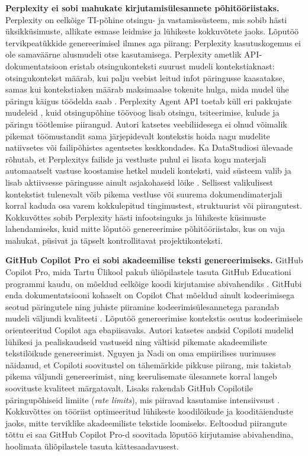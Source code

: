 \textbf{Perplexity ei sobi mahukate kirjutamisülesannete põhitööriistaks.} Perplexity on eelkõige TI-põhine otsingu- ja vastamissüsteem, mis sobib hästi üksikküsimuste, allikate esmase leidmise ja lühikeste kokkuvõtete jaoks. Lõputöö tervikpeatükkide genereerimisel ilmnes aga piirang: Perplexity kasutuskogemus ei ole samaväärne alusmudeli otse kasutamisega. Perplexity ametlik API-dokumentatsioon eristab otsingukonteksti suurust mudeli kontekstiaknast: otsingukontekst määrab, kui palju veebist leitud infot päringusse kaasatakse, samas kui kontekstiaken määrab maksimaalse tokenite hulga, mida mudel ühe päringu käigus töödelda saab \cite{perplexity2026pricing}. Perplexity Agent API toetab küll eri pakkujate mudeleid \cite{perplexity2026models}, kuid otsingupõhine töövoog lisab otsingu, tsiteerimise, kulude ja päringu töötlemise piirangud. Autori katsetes veebiliidesega ei olnud võimalik pikemat töömustandit sama järjepidevalt kontekstis hoida nagu mudelite natiivsetes või failipõhistes agentsetes keskkondades. Ka DataStudiosi ülevaade rõhutab, et Perplexitys failide ja vestluste puhul ei lisata kogu materjali automaatselt vastuse koostamise hetkel mudeli konteksti, vaid süsteem valib ja lisab aktiivsesse päringusse ainult asjakohaseid lõike \cite{datastudios2025perplexity}. Sellisest valikulisest kontekstist tulenevalt võib pikema vestluse või suurema dokumendimaterjali korral kaduda osa varem kokkulepitud tingimustest, struktuurist või piirangutest. Kokkuvõttes sobib Perplexity hästi infootsinguks ja lühikeste küsimuste lahendamiseks, kuid mitte lõputöö genereerimise põhitööriistaks, kus on vaja mahukat, püsivat ja täpselt kontrollitavat projektikonteksti.

\textbf{GitHub Copilot Pro ei sobi akadeemilise teksti genereerimiseks.} GitHub Copilot Pro, mida Tartu Ülikool pakub üliõpilastele tasuta GitHub Educationi programmi kaudu, on mõeldud eelkõige koodi kirjutamise abivahendiks \cite{github2026copilot}. GitHubi enda dokumentatsiooni kohaselt on Copilot Chat mõeldud ainult kodeerimisega seotud päringutele ning juhiste piiramine kodeerimisülesannetega parandab mudeli väljundi kvaliteeti \cite{github2026copilot_responsible}. Lõputöö genereerimise kontekstis osutus kodeerimisele orienteeritud Copilot aga ebapiisavaks. Autori katsetes andsid Copiloti mudelid lühikesi ja pealiskaudseid vastuseid ning vältisid pikemate akadeemiliste tekstilõikude genereerimist. Nguyen ja Nadi \cite{nguyen2022empirical} on oma empiirilises uurimuses näidanud, et Copiloti soovitustel on tähemärkide pikkuse piirang, mis takistab pikema väljundi genereerimist, ning keerulisemate ülesannete korral langeb soovituste kvaliteet märgatavalt. Lisaks rakendab GitHub Copilotile päringupõhiseid limiite (\textit{rate limits}), mis piiravad kasutamise intensiivsust \cite{github2026copilot_ratelimits}. Kokkuvõttes on tööriist optimeeritud lühikeste koodilõikude ja kooditäienduste jaoks, mitte terviklike akadeemiliste tekstide loomiseks. Eeltoodud piirangute tõttu ei saa GitHub Copilot Pro-d soovitada lõputöö kirjutamise abivahendina, hoolimata üliõpilastele tasuta kättesaadavusest.

